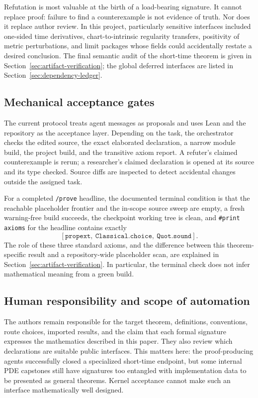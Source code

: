 \documentclass[11pt]{article}
\theoremstyle{plain}
\theoremstyle{definition}
\theoremstyle{remark}
\begin{document}
Refutation is most valuable at the birth of a load-bearing signature.  It
cannot replace proof: failure to find a counterexample is not evidence of
truth.  Nor does it replace author review.  In this project, particularly
sensitive interfaces included one-sided time derivatives, chart-to-intrinsic
regularity transfers, positivity of metric perturbations, and limit packages
whose fields could accidentally restate a desired conclusion.  The final
semantic audit of the short-time theorem is given in
Section~\ref{sec:artifact-verification}; the global deferred interfaces are
listed in Section~\ref{sec:dependency-ledger}.

\subsection{Mechanical acceptance gates}

The current protocol treats agent messages as proposals and uses Lean and the
repository as the acceptance layer.  Depending on the task, the orchestrator
checks the edited source, the exact elaborated declaration, a narrow module
build, the project build, and the transitive axiom report.  A refuter's claimed
counterexample is rerun; a researcher's claimed declaration is opened at its
source and its type checked.  Source diffs are inspected to detect accidental
changes outside the assigned task.

For a completed \texttt{/prove} headline, the documented terminal condition is
that the reachable placeholder frontier and the in-scope source sweep are
empty, a fresh warning-free build succeeds, the checkpoint working tree is
clean, and \texttt{\#print axioms} for the headline contains exactly
\[
  [\texttt{propext},\ \texttt{Classical.choice},\ \texttt{Quot.sound}].
\]
The role of these three standard axioms, and the difference between this
theorem-specific result and a repository-wide placeholder scan, are explained
in Section~\ref{sec:artifact-verification}.  In particular, the terminal check
does not infer mathematical meaning from a green build.

\subsection{Human responsibility and scope of automation}

The authors remain responsible for the target theorem, definitions,
conventions, route choices, imported results, and the claim that each formal
signature expresses the mathematics described in this paper.  They also
review which declarations are suitable public interfaces.  This matters here:
the proof-producing agents successfully closed a specialized short-time
endpoint, but some internal PDE capstones still have signatures too entangled
with implementation data to be presented as general theorems.  Kernel
acceptance cannot make such an interface mathematically well designed.
\end{document}
